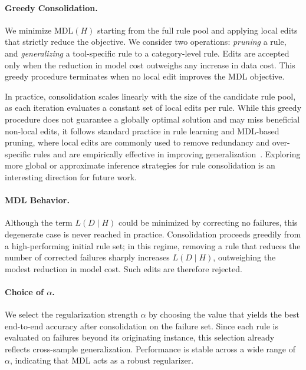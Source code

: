 \paragraph{Greedy Consolidation.}
We minimize \( \mathrm{MDL}(H) \) starting from the full rule pool and applying local edits
that strictly reduce the objective. We consider two operations: \emph{pruning} a rule, and
\emph{generalizing} a tool-specific rule to a category-level rule. Edits are accepted only
when the reduction in model cost outweighs any increase in data cost. This greedy procedure
terminates when no local edit improves the MDL objective.

In practice, consolidation scales linearly with the size of the candidate rule pool, as each iteration evaluates a constant set of local edits per rule. While this greedy procedure does not guarantee a globally optimal solution and may miss beneficial non-local edits, it follows standard practice in rule learning and MDL-based pruning, where local edits are commonly used to remove redundancy and over-specific rules and are empirically effective in improving generalization~\citep{Quinlan87Simplifying,Furnkranz97Pruning,Grunwald07MDL}. Exploring more global or approximate inference strategies for rule consolidation is an interesting direction for future work.


\paragraph{MDL Behavior.}
Although the term \( L(D \mid H) \) could be minimized by correcting no failures,
this degenerate case is never reached in practice. Consolidation proceeds greedily from a
high-performing initial rule set; in this regime, removing a rule that reduces the number
of corrected failures sharply increases \( L(D \mid H) \), outweighing the modest reduction
in model cost. Such edits are therefore rejected.

\paragraph{Choice of $\alpha$.}
We select the regularization strength \( \alpha \) by choosing the value that yields the best
end-to-end accuracy after consolidation on the failure set. Since each rule is evaluated on
failures beyond its originating instance, this selection already reflects cross-sample
generalization. Performance is stable across a wide range of \( \alpha \), indicating that
MDL acts as a robust regularizer.
